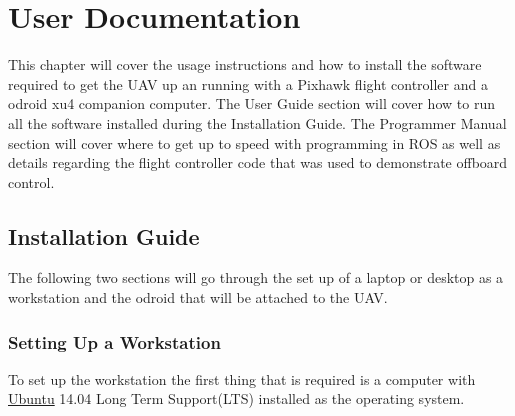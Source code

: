 
\chapter{User Documentation}

This chapter will cover the usage instructions and how to install the software required to get the UAV up an running with a Pixhawk flight controller and a odroid xu4 companion computer. The User Guide section will cover how to run all the software installed during the Installation Guide. The Programmer Manual section will cover where to get up to speed with programming in ROS as well as details regarding the flight controller code that was used to demonstrate offboard control.

\section{Installation Guide}
The following two sections will go through the set up of a laptop or desktop as a workstation and the odroid that will be attached to the UAV.
\subsection{Setting Up a Workstation}
To set up the workstation the first thing that is required is a computer with \href{http://www.ubuntu.com/download/desktop}{Ubuntu} 14.04 Long Term Support(LTS) installed as the operating system. 
